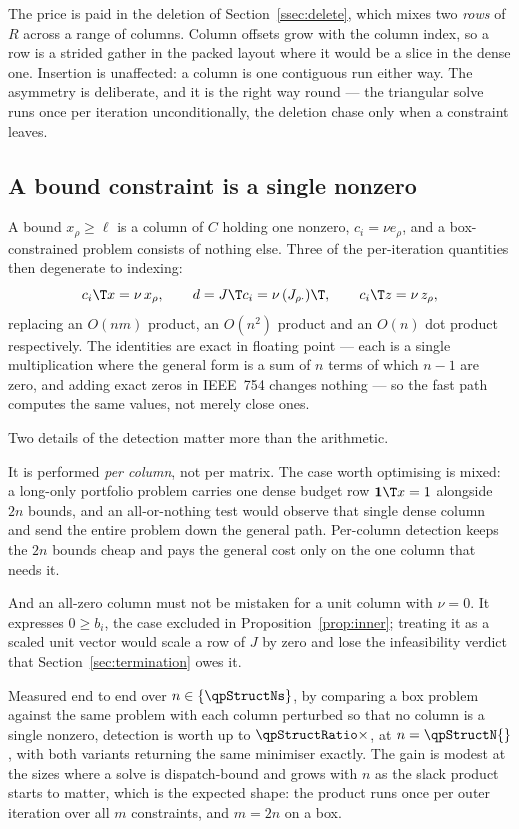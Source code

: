 The price is paid in the deletion of Section~\ref{ssec:delete}, which mixes two
\emph{rows} of $R$ across a range of columns. Column offsets grow with the column
index, so a row is a strided gather in the packed layout where it would be a slice
in the dense one. Insertion is unaffected: a column is one contiguous run either
way. The asymmetry is deliberate, and it is the right way round --- the triangular
solve runs once per iteration unconditionally, the deletion chase only when a
constraint leaves.

\subsection{A bound constraint is a single nonzero}
\label{ssec:structure}

A bound $x_\rho \ge \ell$ is a column of $C$ holding one nonzero, $c_i = \nu
e_\rho$, and a box-constrained problem consists of nothing else. Three of the
per-iteration quantities then degenerate to indexing:
\begin{equation}
  c_i\T x = \nu\, x_\rho,
  \qquad
  d = J\T c_i = \nu\, (J_{\rho\cdot})\T,
  \qquad
  c_i\T z = \nu\, z_\rho ,
  \label{eq:unit}
\end{equation}
replacing an $O(nm)$ product, an $O(n^2)$ product and an $O(n)$ dot product
respectively. The identities are exact in floating point --- each is a single
multiplication where the general form is a sum of $n$ terms of which $n-1$ are
zero, and adding exact zeros in IEEE~754 changes nothing --- so the fast path
computes the same values, not merely close ones.

Two details of the detection matter more than the arithmetic.

It is performed \emph{per column}, not per matrix. The case worth optimising is
mixed: a long-only portfolio problem carries one dense budget row
$\mathbf{1}\T x = 1$ alongside $2n$ bounds, and an all-or-nothing test would
observe that single dense column and send the entire problem down the general
path. Per-column detection keeps the $2n$ bounds cheap and pays the general cost
only on the one column that needs it.

And an all-zero column must not be mistaken for a unit column with $\nu = 0$. It
expresses $0 \ge b_i$, the case excluded in Proposition~\ref{prop:inner}; treating
it as a scaled unit vector would scale a row of $J$ by zero and lose the
infeasibility verdict that Section~\ref{sec:termination} owes it.

Measured end to end over $n \in \{\qpStructNs\}$, by comparing a box problem
against the same problem with each column perturbed so that no column is a single
nonzero, detection is worth up to $\qpStructRatio\times$, at
$n = \qpStructN{}$, with both variants returning the same minimiser exactly. The
gain is modest at the sizes where a solve is dispatch-bound and grows with $n$ as
the slack product starts to matter, which is the expected shape: the product runs
once per outer iteration over all $m$ constraints, and $m = 2n$ on a box.

